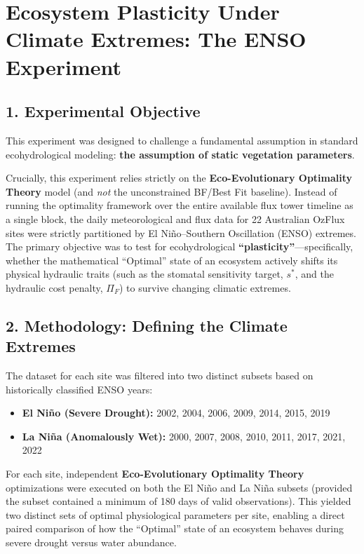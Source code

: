 \section*{Ecosystem Plasticity Under Climate Extremes: The ENSO Experiment}

\subsection*{1. Experimental Objective}
This experiment was designed to challenge a fundamental assumption in standard ecohydrological modeling: \textbf{the assumption of static vegetation parameters}. 

Crucially, this experiment relies strictly on the \textbf{Eco-Evolutionary Optimality Theory} model (and \textit{not} the unconstrained BF/Best Fit baseline). Instead of running the optimality framework over the entire available flux tower timeline as a single block, the daily meteorological and flux data for 22 Australian OzFlux sites were strictly partitioned by El Ni\~no--Southern Oscillation (ENSO) extremes. The primary objective was to test for ecohydrological \textbf{``plasticity''}---specifically, whether the mathematical ``Optimal'' state of an ecosystem actively shifts its physical hydraulic traits (such as the stomatal sensitivity target, $s^*$, and the hydraulic cost penalty, $\Pi_F$) to survive changing climatic extremes.

\subsection*{2. Methodology: Defining the Climate Extremes}
The dataset for each site was filtered into two distinct subsets based on historically classified ENSO years:
\begin{itemize}
    \item \textbf{El Ni\~no (Severe Drought):} 2002, 2004, 2006, 2009, 2014, 2015, 2019
    \item \textbf{La Ni\~na (Anomalously Wet):} 2000, 2007, 2008, 2010, 2011, 2017, 2021, 2022
\end{itemize}

For each site, independent \textbf{Eco-Evolutionary Optimality Theory} optimizations were executed on both the El Ni\~no and La Ni\~na subsets (provided the subset contained a minimum of 180 days of valid observations). This yielded two distinct sets of optimal physiological parameters per site, enabling a direct paired comparison of how the ``Optimal'' state of an ecosystem behaves during severe drought versus water abundance.

